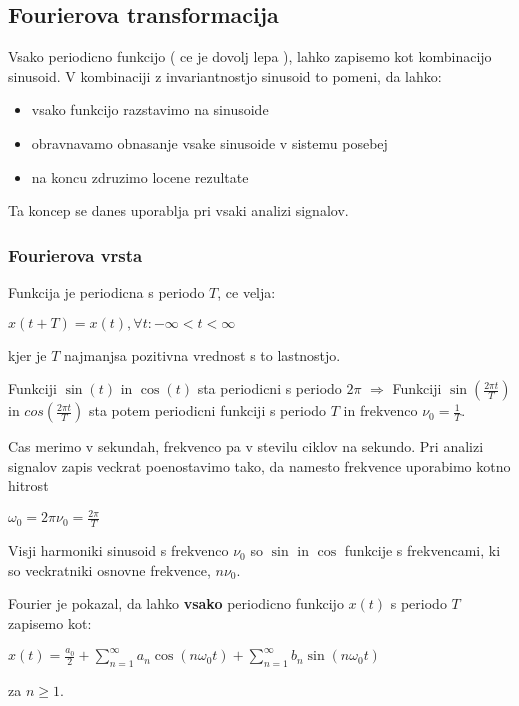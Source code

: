 \documentclass{article}
\begin{document}
\begin{multicols}{4}
\subsection{Fourierova transformacija}
Vsako periodicno funkcijo ( ce je dovolj lepa ), lahko zapisemo kot kombinacijo sinusoid.
V kombinaciji z invariantnostjo sinusoid to pomeni, da lahko:
\begin{itemize}
    \item vsako funkcijo razstavimo na sinusoide
    \item obravnavamo obnasanje vsake sinusoide v sistemu posebej
    \item na koncu zdruzimo locene rezultate
\end{itemize}
Ta koncep se danes uporablja pri vsaki analizi signalov.

\subsubsection{Fourierova vrsta}
Funkcija je periodicna s periodo $T$, ce velja:
\begin{center}
    \begin{math}
        x(t + T) = x(t), \forall t: -\infty < t < \infty
    \end{math}
\end{center}
kjer je $T$ najmanjsa pozitivna vrednost s to lastnostjo.

Funkciji $\sin(t)$ in $\cos(t)$ sta periodicni s periodo $2\pi$  $\Rightarrow$
Funkciji $\sin(\frac{2 \pi t}{T})$ in $cos(\frac{2 \pi t}{T})$ sta potem periodicni funkciji 
s periodo $T$ in frekvenco $\nu_0 = \frac{1}{T}$.

Cas merimo v sekundah, frekvenco pa v stevilu ciklov na sekundo. Pri analizi
signalov zapis veckrat poenostavimo tako, da namesto frekvence uporabimo kotno hitrost
\begin{center}
    \begin{math}
        \omega_0 = 2 \pi \nu_0 = \frac{2\pi}{T}
    \end{math}
\end{center}

Visji harmoniki sinusoid s frekvenco $\nu_0$ so $\sin$ in $\cos$ funkcije s frekvencami,
ki so veckratniki osnovne frekvence, $n \nu_0$.

Fourier je pokazal, da lahko \textbf{vsako} periodicno funkcijo $x(t)$ s periodo $T$ zapisemo kot:
\begin{center}
    \begin{math}
        x(t) = \frac{a_0}{2} + \sum_{n = 1}^{\infty} a_n \cos(n \omega_0 t) +
        \sum_{n = 1}^{\infty} b_n \sin(n \omega_0 t)
    \end{math}
\end{center}
za $n \geq 1$.


\end{multicols}
\end{document}

